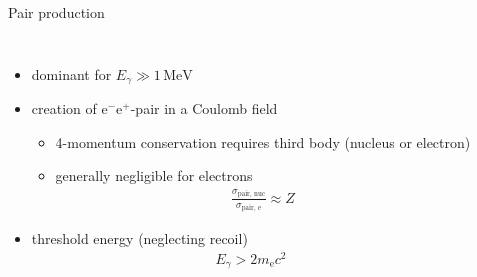 \documentclass[11pt,xcolor=dvipsnames,professionalfonts]{beamer}
\begin{document}
\begin{frame}{Pair production}
\begin{columns}
	\begin{itemize}
		\setlength\itemsep{1.5em}
		\item dominant for $E_\gamma \gg 1 \, \mathrm{MeV}$
		
		\item creation of $\mathrm{e}^- \mathrm{e}^+$-pair in a Coulomb field
		\begin{itemize}
			\item 4-momentum conservation requires third body (nucleus or electron)
			\item generally negligible for electrons
			\begin{align*}
				\frac{\sigma_\mathrm{pair,\, nuc}}{\sigma_\mathrm{pair,\, e}} \approx Z
			\end{align*}
		\end{itemize}
		
		\item threshold energy (neglecting recoil)
		\begin{align*}
			E_\gamma > 2 m_\mathrm{e}c^2
		\end{align*}
		
		
	\end{itemize}
	

\end{columns}
\end{frame}
\end{document}
